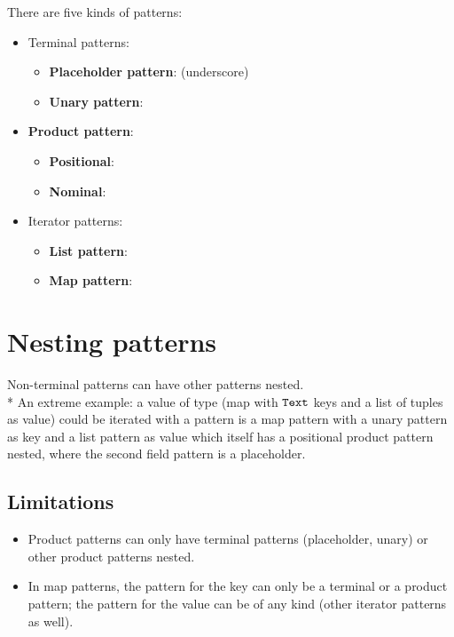 There are five kinds of patterns:
\begin{itemize}
	\item Terminal patterns:
		\begin{itemize}
			\item \textbf{Placeholder pattern}: \code{\_} (underscore)
			\item \textbf{Unary pattern}: 
		\end{itemize}
	\item \textbf{Product pattern}:
		\begin{itemize}
			\item \textbf{Positional}: 
			\item \textbf{Nominal}: 
		\end{itemize}
	\item Iterator patterns:
		\begin{itemize}
			\item \textbf{List pattern}: \code{[someIdentifier]}
			\item \textbf{Map pattern}: \code{[key => value]}
		\end{itemize}
\end{itemize}

\section{Nesting patterns}

Non-terminal patterns can have other patterns nested.\\*
An extreme example: a value of type \code{[Text=>[tuple<Int,Int,Int>]]} (map
with $\texttt{Text}$ keys and a list of tuples as value) could be iterated with a
pattern \code{[colorName=>[<r,\_,b>]]} is a map pattern with a unary pattern as
key and a list pattern as value which itself has a positional product pattern
nested, where the second field pattern is a placeholder.


\subsection{Limitations}

\begin{itemize}
	\item Product patterns can only have terminal patterns (placeholder, unary)
		or other product patterns nested.
	\item In map patterns, the pattern for the key can only be a terminal or a
		product pattern; the pattern for the value can be of any kind (other
		iterator patterns as well).
\end{itemize}

